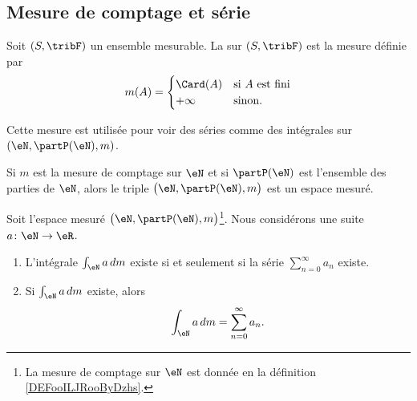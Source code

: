 \subsection{Mesure de comptage et série}

\begin{definition}      \label{DEFooILJRooByDzhs}
    Soit \( (S,\tribF)\) un ensemble mesurable. La  sur \( (S,\tribF)\) est la mesure définie par
    \begin{equation}
        m(A)=\begin{cases}
            \Card(A)    &   \text{si } A\text{ est fini}\\
            +\infty    &    \text{sinon}.
        \end{cases}
    \end{equation}
\end{definition}
Cette mesure est utilisée pour voir des séries comme des intégrales sur \( (\eN,\partP(\eN),m)\).

\begin{lemma}       \label{LEMooDTFHooLVsvAw}
    Si \( m\) est la mesure de comptage sur \( \eN\) et si \( \partP(\eN)\) est l'ensemble des parties de \( \eN\), alors le triple \( \big( \eN,\partP(\eN), m \big)\) est un espace mesuré.
\end{lemma}

\begin{proposition}     \label{PROPooPNQAooDRLcCm}
    Soit l'espace mesuré \( \big( \eN,\partP(\eN), m \big)\)\footnote{La mesure de comptage sur \( \eN\) est donnée en la définition \ref{DEFooILJRooByDzhs}.}. Nous considérons une suite \( a\colon \eN\to \eR\).

    \begin{enumerate}
        \item
            L'intégrale \( \int_{\eN}a\,dm\) existe si et seulement si la série \( \sum_{n=0}^{\infty}a_n\) existe.
        \item
            Si \( \int_{\eN}a\,dm\) existe, alors
            \begin{equation}
                \int_{\eN}a\,dm=\sum_{n=0}^{\infty}a_n.
            \end{equation}
    \end{enumerate}
\end{proposition}

